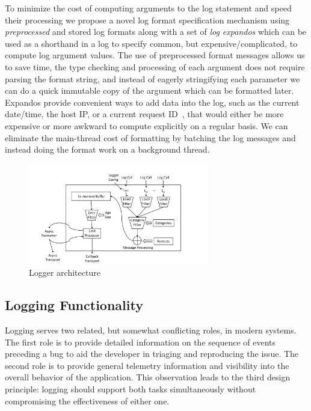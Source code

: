 To minimize the cost of computing arguments to the log statement and speed their 
processing we propose a novel log format specification mechanism using 
\emph{preprocessed} and stored log formats along with a set of \emph{log expandos} 
which can be used as a shorthand in a log to specify common, but expensive/complicated, 
to compute log argument values. The use of preprocessed format messages allows us to save time, 
the type checking and processing of each argument does not require parsing the 
format string, and instead of eagerly stringifying each parameter we can do a quick 
immutable copy of the argument which can be formatted later. Expandos provide convenient 
ways to add data into the log, such as the current date/time, the host IP, or a 
current request ID~\cite{asynchjs}, that would either be more expensive or more awkward to compute 
explicitly on a regular basis. We can eliminate the main-thread cost of formatting by batching 
the log messages and instead doing the format work on a background thread.

\begin{figure}
    \centering
    \includegraphics[width=0.7\textwidth]{Figures/ArchDiagram}
    \caption{Logger architecture}
    \label{fig:arch}
\end{figure}

\subsection{Logging Functionality}
\label{subsec:functionalitydesign}
\begin{design}
Logging serves two related, but somewhat conflicting roles, in modern systems. 
The first role is to provide detailed information 
on the sequence of events preceding a bug to aid the developer in triaging and 
reproducing the issue. The second role is to provide general telemetry 
information and visibility into the overall behavior of the application. 
This observation leads to the third design principle: logging should 
support both tasks simultaneously without compromising the 
effectiveness of either one.
\end{design}

